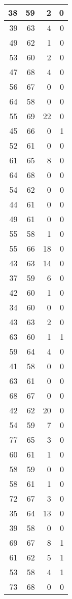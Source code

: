\begin{tabular}{rrrr}
\toprule
 38 &  59 &  2 &  0 \\
\midrule
 39 &  63 &  4 &  0 \\
 49 &  62 &  1 &  0 \\
 53 &  60 &  2 &  0 \\
 47 &  68 &  4 &  0 \\
 56 &  67 &  0 &  0 \\
 64 &  58 &  0 &  0 \\
 55 &  69 & 22 &  0 \\
 45 &  66 &  0 &  1 \\
 52 &  61 &  0 &  0 \\
 61 &  65 &  8 &  0 \\
 64 &  68 &  0 &  0 \\
 54 &  62 &  0 &  0 \\
 44 &  61 &  0 &  0 \\
 49 &  61 &  0 &  0 \\
 55 &  58 &  1 &  0 \\
 55 &  66 & 18 &  0 \\
 43 &  63 & 14 &  0 \\
 37 &  59 &  6 &  0 \\
 42 &  60 &  1 &  0 \\
 34 &  60 &  0 &  0 \\
 43 &  63 &  2 &  0 \\
 63 &  60 &  1 &  1 \\
 59 &  64 &  4 &  0 \\
 41 &  58 &  0 &  0 \\
 63 &  61 &  0 &  0 \\
 68 &  67 &  0 &  0 \\
 42 &  62 & 20 &  0 \\
 54 &  59 &  7 &  0 \\
 77 &  65 &  3 &  0 \\
 60 &  61 &  1 &  0 \\
 58 &  59 &  0 &  0 \\
 58 &  61 &  1 &  0 \\
 72 &  67 &  3 &  0 \\
 35 &  64 & 13 &  0 \\
 39 &  58 &  0 &  0 \\
 69 &  67 &  8 &  1 \\
 61 &  62 &  5 &  1 \\
 53 &  58 &  4 &  1 \\
 73 &  68 &  0 &  0 \\

\end{tabular}
